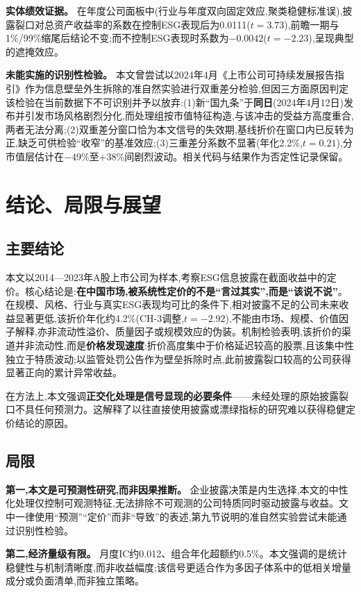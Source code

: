 \documentclass[UTF8, a4paper, fontset=fandol, zihao=-4]{ctexart}
\begin{document}
\textbf{实体绩效证据。} 在年度公司面板中(行业与年度双向固定效应,聚类稳健标准误),披露裂口对总资产收益率的系数在控制ESG表现后为0.0111($t=3.73$),前瞻一期与1\%/99\%缩尾后结论不变;而不控制ESG表现时系数为$-0.0042$($t=-2.23$),呈现典型的遮掩效应。

\textbf{未能实施的识别性检验。} 本文曾尝试以2024年4月《上市公司可持续发展报告指引》作为信息壁垒外生拆除的准自然实验进行双重差分检验,但因三方面原因判定该检验在当前数据下不可识别并予以放弃:(1)新“国九条”于\textbf{同日}(2024年4月12日)发布并引发市场风格剧烈分化,而处理组按市值特征构造,与该冲击的受益方高度重合,两者无法分离;(2)双重差分窗口恰为本文信号的失效期,基线折价在窗口内已反转为正,缺乏可供检验“收窄”的基准效应;(3)三重差分系数不显著(年化2.2\%,$t=0.21$),分市值层估计在$-49$\%至$+38$\%间剧烈波动。相关代码与结果作为否定性记录保留。

\section{结论、局限与展望}

\subsection{主要结论}

本文以2014—2023年A股上市公司为样本,考察ESG信息披露在截面收益中的定价。核心结论是:\textbf{在中国市场,被系统性定价的不是“言过其实”,而是“该说不说”}。在规模、风格、行业与真实ESG表现均可比的条件下,相对披露不足的公司未来收益显著更低,该折价年化约4.2\%(CH-3调整,$t=-2.92$),不能由市场、规模、价值因子解释,亦非流动性溢价、质量因子或规模效应的伪装。机制检验表明,该折价的渠道并非流动性,而是\textbf{价格发现速度}:折价高度集中于价格延迟较高的股票,且该集中性独立于特质波动;以监管处罚公告作为壁垒拆除时点,此前披露裂口较高的公司获得显著正向的累计异常收益。

在方法上,本文强调\textbf{正交化处理是信号显现的必要条件}——未经处理的原始披露裂口不具任何预测力。这解释了以往直接使用披露或漂绿指标的研究难以获得稳健定价结论的原因。

\subsection{局限}

\textbf{第一,本文是可预测性研究,而非因果推断。} 企业披露决策是内生选择,本文的中性化处理仅控制可观测特征,无法排除不可观测的公司特质同时驱动披露与收益。文中一律使用“预测”“定价”而非“导致”的表述,第九节说明的准自然实验尝试未能通过识别性检验。

\textbf{第二,经济量级有限。} 月度IC约0.012、组合年化超额约0.5\%。本文强调的是统计稳健性与机制清晰度,而非收益幅度;该信号更适合作为多因子体系中的低相关增量成分或负面清单,而非独立策略。
\end{document}
